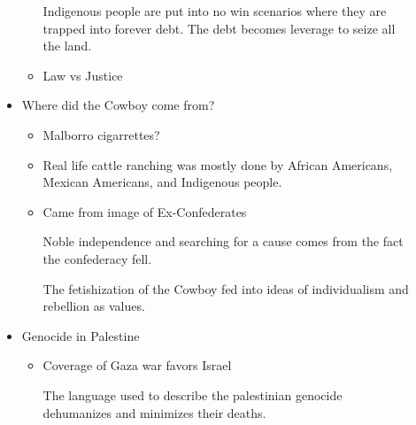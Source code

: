 \documentclass{report}
\begin{document}
\begin{description}
\begin{itemize}
\begin{itemize}
\begin{mdframed}
                            Indigenous people are put into
                            no win scenarios where they are
                            trapped into forever debt. The
                            debt becomes leverage to seize
                            all the land.
                        \end{mdframed}
                    \item Law vs Justice
                \end{itemize}
            \item Where did the Cowboy come from?
                \begin{itemize}
                    \item Malborro cigarrettes?
                    \item Real life cattle ranching was
                        mostly done by African Americans,
                        Mexican Americans, and Indigenous
                        people.
                    \item Came from image of Ex-Confederates
                        \begin{mdframed}
                            Noble independence and searching
                            for a cause comes from the
                            fact the confederacy fell.

                            The fetishization of the Cowboy
                            fed into ideas of individualism
                            and rebellion as values.
                        \end{mdframed}
                \end{itemize}

            \item Genocide in Palestine
                \begin{itemize}
                    \item Coverage of Gaza war favors Israel
                        \begin{mdframed}
                            The language used to describe
                            the palestinian genocide dehumanizes
                            and minimizes their deaths.


\end{mdframed}
\end{itemize}
\end{itemize}
\end{description}
\end{document}
